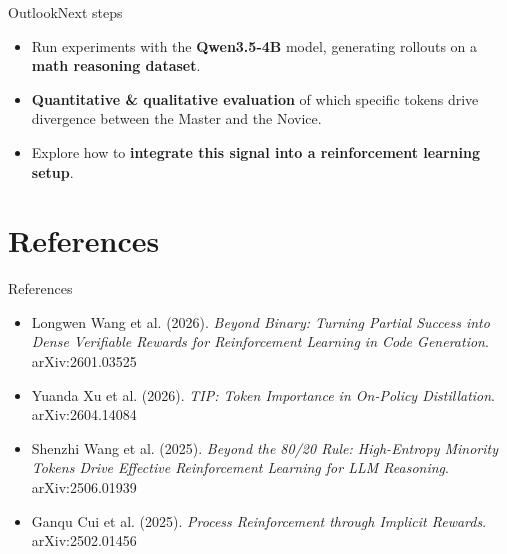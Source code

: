 \documentclass[
  english,            %
  aspectratio=169,    %
]{tumbeamer}
\begin{document}
\begin{frame}{Outlook}{Next steps}

\begin{itemize}
    \item Run experiments with the \textbf{Qwen3.5-4B} model, generating rollouts on a \textbf{math reasoning dataset}.
    \item \textbf{Quantitative \& qualitative evaluation} of which specific tokens drive divergence between the Master and the Novice.
    \item Explore how to \textbf{integrate this signal into a reinforcement learning setup}.
\end{itemize}

\vspace{4mm}
\centering
{}

\end{frame}

\section{References}

\begin{frame}{References}

\small

\begin{itemize}
    \item Longwen Wang et al. (2026).
    \textit{Beyond Binary: Turning Partial Success into Dense Verifiable Rewards for Reinforcement Learning in Code Generation}.
    arXiv:2601.03525
    \item Yuanda Xu et al. (2026).
    \textit{TIP: Token Importance in On-Policy Distillation}.
    arXiv:2604.14084
    \item Shenzhi Wang et al. (2025).
    \textit{Beyond the 80/20 Rule: High-Entropy Minority Tokens Drive Effective Reinforcement Learning for LLM Reasoning}.
    arXiv:2506.01939
    \item Ganqu Cui et al. (2025).
    \textit{Process Reinforcement through Implicit Rewards}.
    arXiv:2502.01456
\end{itemize}

\end{frame}
\end{document}
